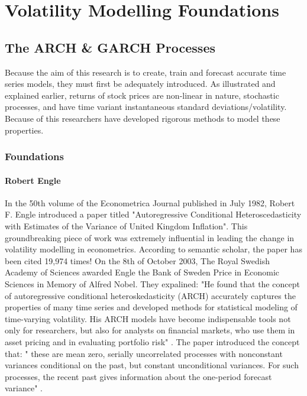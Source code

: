 \chapter{Volatility Modelling Foundations}

\section{The ARCH \& GARCH Processes}
Because the aim of this research is to create, train and forecast accurate time series models, they must first be adequately introduced. As illustrated and explained earlier, returns of stock prices are non-linear in nature, stochastic processes, and have time variant instantaneous standard deviations/volatility. Because of this researchers have developed rigorous methods  to model these properties. 

\subsection{Foundations}
\subsubsection{Robert Engle}
In the 50th volume of the Econometrica Journal published in July 1982, Robert F. Engle introduced a paper titled "Autoregressive Conditional Heteroscedasticity with Estimates of the Variance of United Kingdom Inflation". This groundbreaking piece of work was extremely influential in leading the change in volatility modelling in econometrics. According to semantic scholar, the paper has been cited 19,974 times! On the 8th of October 2003, The Royal Swedish Academy of Sciences awarded Engle the Bank of Sweden Price in Economic Sciences in Memory of Alfred Nobel. They expalined: "He found that the concept of autoregressive conditional heteroskedasticity (ARCH) accurately captures the properties of many time series and developed methods for statistical modeling of time-varying volatility. His ARCH models have become indispensable tools not only for researchers, but also for analysts on financial markets, who use them in asset pricing and in evaluating portfolio risk" \cite{pressrelease_2003}. The paper introduced the concept that: " these are mean zero, serially uncorrelated processes with nonconstant variances conditional on the past, but constant unconditional variances. For such processes, the recent past gives information about the one-period forecast variance" \cite{engleOriginal}. 

